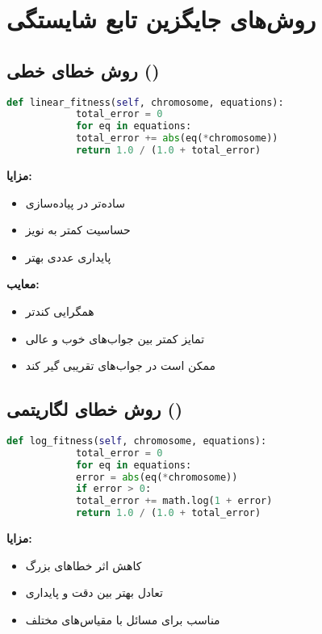 \documentclass[12pt,a4paper]{article}
\newenvironment{ltrcode}{\lr\bgroup}{\egroup}
\begin{document}
	\section{روش‌های جایگزین تابع شایستگی}
	
	\subsection{روش خطای خطی ()}
	
	\begin{ltrcode}
		\begin{lstlisting}[language=Python, caption=تابع شایستگی خطی]
			def linear_fitness(self, chromosome, equations):
			total_error = 0
			for eq in equations:
			total_error += abs(eq(*chromosome))
			return 1.0 / (1.0 + total_error)
		\end{lstlisting}
	\end{ltrcode}
	
	\textbf{مزایا:}
	\begin{itemize}
		\item ساده‌تر در پیاده‌سازی
		\item حساسیت کمتر به نویز
		\item پایداری عددی بهتر
	\end{itemize}
	
	\textbf{معایب:}
	\begin{itemize}
		\item همگرایی کندتر
		\item تمایز کمتر بین جواب‌های خوب و عالی
		\item ممکن است در جواب‌های تقریبی گیر کند
	\end{itemize}
	
	\subsection{روش خطای لگاریتمی ()}
	
	\begin{ltrcode}
		\begin{lstlisting}[language=Python, caption=تابع شایستگی لگاریتمی]
			def log_fitness(self, chromosome, equations):
			total_error = 0
			for eq in equations:
			error = abs(eq(*chromosome))
			if error > 0:
			total_error += math.log(1 + error)
			return 1.0 / (1.0 + total_error)
		\end{lstlisting}
	\end{ltrcode}
	
	\textbf{مزایا:}
	\begin{itemize}
		\item کاهش اثر خطاهای بزرگ
		\item تعادل بهتر بین دقت و پایداری
		\item مناسب برای مسائل با مقیاس‌های مختلف
	\end{itemize}
	
\end{document}
